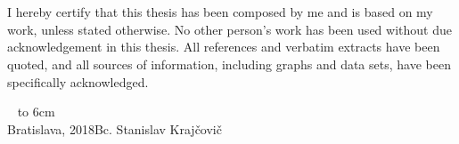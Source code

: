 \documentclass[12pt, a4paper, oneside]{book}
\newcommand{\mfauthor}{Bc. Stanislav Krajčovič}
\newcommand{\mfplacedate}{Bratislava, 2018}
\begin{document}
\begin{figure}[H]
\begin{center}
\label{img:zadanie}
\end{center}
\end{figure}

{~}\vspace{12cm}

\noindent
\begin{minipage}{0.25\textwidth}~\end{minipage}
\begin{minipage}{0.75\textwidth}
I hereby certify that this thesis has been composed by me and is based on my work, unless stated otherwise. No other person's work has been used without due acknowledgement in this thesis. All references and verbatim extracts have been quoted, and all sources of information, including graphs and data sets, have been specifically acknowledged.
\newline \newline
\end{minipage}
\vfill
~ \hfill {\hbox to 6cm{\dotfill}} \\
\mfplacedate \hfill \mfauthor
\vfill\eject 
\end{document}
